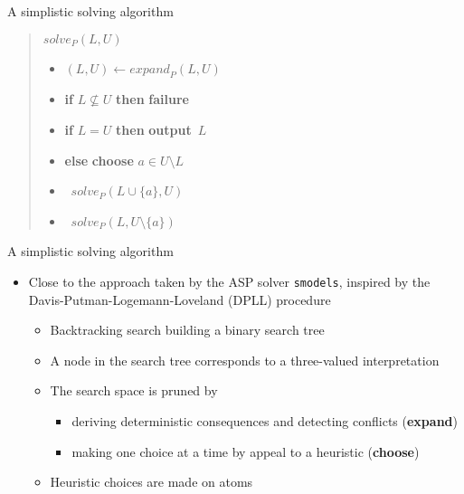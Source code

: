 \begin{frame}{A simplistic solving algorithm}
\bigskip
\begin{quote}
$\mathit{solve}_P(L,U)$
\medskip
\begin{itemize}\itemsep .5ex
\item [] $(L,U)\leftarrow\mathit{expand}_P(L,U)$\hfill{}
\item [] \textbf{if} $L\not\subseteq U$ \textbf{then} \textbf{failure}\hfill{}
\item [] \textbf{if} $L=U$              \textbf{then} \textbf{output}~$L$\hfill{}
\item [] \textbf{else} \textbf{choose} $a\in U\setminus L$\hfill{}
\item [] \qquad\ $\mathit{solve}_P(L\cup\{a\},U              )$
\item [] \qquad\ $\mathit{solve}_P(L,         U\setminus\{a\})$
\end{itemize}
\end{quote}
\end{frame}
\begin{frame}{A simplistic solving algorithm}
\bigskip
\begin{itemize}
  \item Close to the approach taken by the ASP solver \texttt{smodels},
    inspired by the Davis-Putman-Logemann-Loveland (DPLL) procedure
    \smallskip
  \begin{itemize}
  \item<2-> Backtracking search building a binary search tree
  \item<2-> A node in the search tree corresponds to a three-valued interpretation
    \smallskip
  \item<3-> The search space is pruned by
    \begin{itemize}
    \item deriving deterministic consequences and detecting conflicts (\textbf{expand})
    \item making one choice at a time by appeal to a heuristic (\textbf{choose})
    \end{itemize}
    \smallskip
  \item<4-> Heuristic choices are made on atoms
  \end{itemize}
\end{itemize}
\end{frame}
